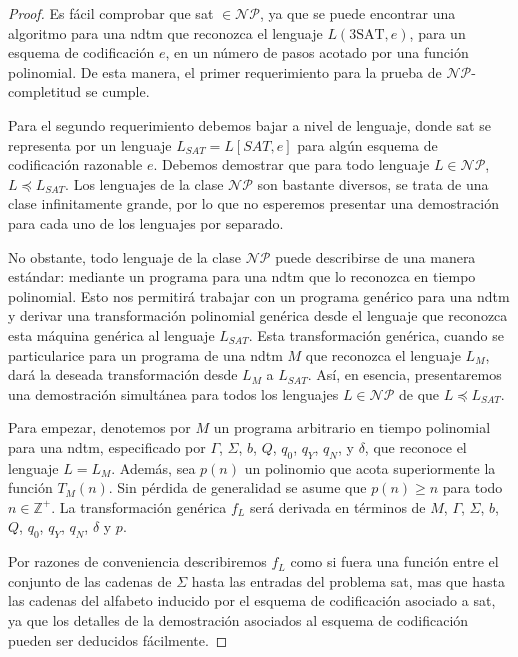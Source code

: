 \documentclass[a4paper, spanish, utf8]{memoir}
\begin{document}
\begin{proof}
Es fácil comprobar que \gls{sat}	$\in \mathcal{NP}$, ya que se puede encontrar una algoritmo para una \gls{ndtm} que reconozca el lenguaje $L(\mbox{3SAT},e)$, para un esquema de codificación $e$, en un número de pasos acotado por una función polinomial. De esta manera, el primer requerimiento para la prueba de $\mathcal{NP}$-completitud se cumple.

Para el segundo requerimiento debemos bajar a nivel de lenguaje, donde \gls{sat} se representa por un lenguaje $L_{SAT}=L[SAT,e]$ para algún esquema de codificación razonable $e$. Debemos demostrar que para todo lenguaje $L\in \mathcal{NP}$, $L \preceq L_{SAT}$. Los lenguajes de la clase $\mathcal{NP}$ son bastante diversos, se trata de una clase infinitamente grande, por lo que no esperemos presentar una demostración para cada uno de los lenguajes por separado.

No obstante, todo lenguaje de la clase $\mathcal{NP}$ puede describirse de una manera estándar: mediante un programa para una \gls{ndtm} que lo reconozca en tiempo polinomial. Esto nos permitirá trabajar con un programa genérico para una \gls{ndtm} y derivar una transformación polinomial genérica desde el lenguaje que reconozca esta máquina genérica al lenguaje $L_{SAT}$. Esta transformación genérica, cuando se particularice para un programa de una \gls{ndtm} $M$ que reconozca el lenguaje $L_M$, dará la deseada transformación desde $L_M$ a $L_{SAT}$. Así, en esencia, presentaremos una demostración simultánea para todos los lenguajes $L\in \mathcal{NP}$ de que $L \preceq L_{SAT}$.

Para empezar, denotemos por $M$ un programa arbitrario en tiempo polinomial para una \gls{ndtm}, especificado por $\Gamma$, $\Sigma$, $b$, $Q$, $q_0$, $q_Y$, $q_N$, y $\delta$, que reconoce el lenguaje $L=L_M$. Además, sea $p(n)$ un polinomio que acota superiormente la función $T_M(n)$. Sin pérdida de generalidad se asume que $p(n)\ge n$ para todo $n\in \mathbb{Z}^+$. La transformación genérica $f_L$ será derivada en términos de $M$, $\Gamma$, $\Sigma$, $b$, $Q$, $q_0$, $q_Y$, $q_N$, $\delta$ y $p$.

Por razones de conveniencia describiremos $f_L$ como si fuera una función entre el conjunto de las cadenas de $\Sigma$ hasta las entradas del problema \gls{sat}, mas que hasta las cadenas del alfabeto inducido por el esquema de codificación asociado a \gls{sat}, ya que los detalles de la demostración asociados al esquema de codificación pueden ser deducidos fácilmente.


\end{proof}
\end{document}
